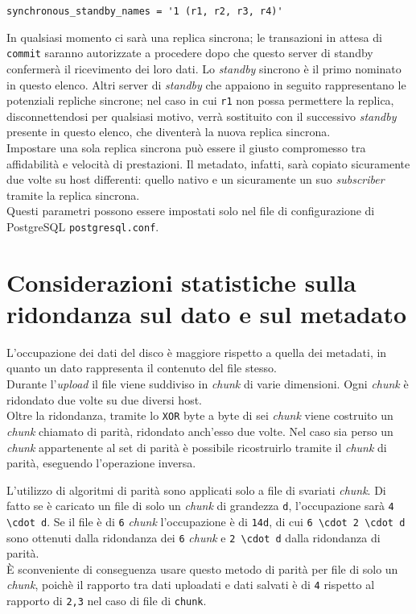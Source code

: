 \begin{center}

\verb"synchronous_standby_names = '1 (r1, r2, r3, r4)'"

\end{center}

In qualsiasi momento ci sar\`{a} una replica sincrona; le transazioni in attesa di \verb"commit" saranno autorizzate a procedere dopo che questo server di standby confermer\`{a} il ricevimento dei loro dati. 
Lo \textit{standby} sincrono \`{e} il primo nominato in questo elenco. Altri server di \textit{standby} che appaiono in seguito rappresentano le potenziali repliche sincrone; nel caso in cui \verb"r1" non possa permettere la replica, disconnettendosi per qualsiasi motivo, verr\`{a} sostituito con il successivo \textit{standby} presente in questo elenco, che diventer\`{a} la nuova replica sincrona. \\

Impostare una sola replica sincrona pu\`{o} essere il giusto compromesso tra affidabilit\`{a} e velocit\`{a} di prestazioni. Il metadato, infatti, sar\`{a} copiato sicuramente due volte su host differenti: quello nativo e un sicuramente un suo \textit{subscriber} tramite la replica sincrona.\\

Questi parametri possono essere impostati solo nel file di configurazione di PostgreSQL \verb"postgresql.conf".

\section{Considerazioni statistiche sulla ridondanza sul dato e sul metadato}
L'occupazione dei dati del disco \`{e} maggiore rispetto a quella dei metadati, in quanto un dato rappresenta il contenuto del file stesso.\\

Durante l'\textit{upload} il file viene suddiviso in \textit{chunk} di varie dimensioni. Ogni \textit{chunk} \`{e} ridondato due volte su due diversi host.\\
Oltre la ridondanza, tramite lo \verb"XOR" byte a byte di sei \textit{chunk} viene costruito un \textit{chunk} chiamato di parit\`{a}, ridondato anch'esso due volte. 
Nel caso sia perso un \textit{chunk} appartenente al set di parit\`{a} \`{e} possibile ricostruirlo tramite il \textit{chunk} di parit\`{a}, eseguendo l'operazione inversa.

L'utilizzo di algoritmi di parit\`{a} sono applicati solo a file di svariati \textit{chunk}. Di fatto se \`{e} caricato un file di solo un \textit{chunk} di grandezza \verb"d", l'occupazione sar\`{a} \verb"4 \cdot d". Se il file \`{e} di \verb"6" \textit{chunk} l'occupazione \`{e} di \verb"14d", di cui \verb"6 \cdot 2 \cdot d" sono ottenuti dalla ridondanza dei \verb"6" \textit{chunk} e \verb"2 \cdot d" dalla ridondanza di parit\`{a}.\\
\`{E} sconveniente di conseguenza usare questo metodo di parit\`{a} per file di solo un \textit{chunk}, poich\`{e} il rapporto tra dati uploadati e dati salvati \`{e} di \verb"4" rispetto al rapporto di \verb"2,3" nel caso di file di \verb"chunk".\\

